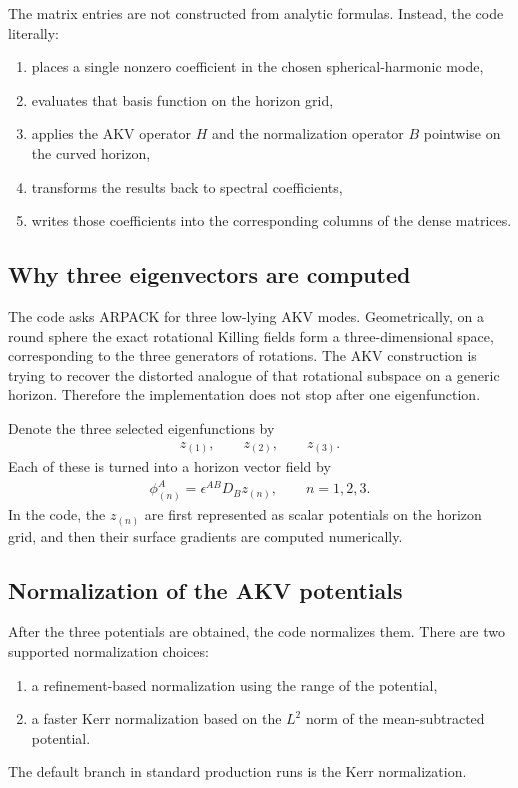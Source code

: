 The matrix entries are not constructed from analytic formulas.  Instead, the code literally:
\begin{enumerate}
\item places a single nonzero coefficient in the chosen spherical-harmonic mode,
\item evaluates that basis function on the horizon grid,
\item applies the AKV operator $H$ and the normalization operator $B$ pointwise on the curved horizon,
\item transforms the results back to spectral coefficients,
\item writes those coefficients into the corresponding columns of the dense matrices.
\end{enumerate}

\subsection{Why three eigenvectors are computed}

The code asks ARPACK for three low-lying AKV modes.  Geometrically, on a round sphere the exact rotational Killing fields form a three-dimensional space, corresponding to the three generators of rotations.  The AKV construction is trying to recover the distorted analogue of that rotational subspace on a generic horizon.  Therefore the implementation does not stop after one eigenfunction.

Denote the three selected eigenfunctions by
\begin{align}
z_{(1)}, \qquad z_{(2)}, \qquad z_{(3)}.
\end{align}
Each of these is turned into a horizon vector field by
\begin{align}
\phi^A_{(n)} = \epsilon^{AB} D_B z_{(n)},
\qquad n=1,2,3.
\label{eq:spec-phi-n}
\end{align}
In the code, the $z_{(n)}$ are first represented as scalar potentials on the horizon grid, and then their surface gradients are computed numerically.

\subsection{Normalization of the AKV potentials}

After the three potentials are obtained, the code normalizes them.  There are two supported normalization choices:
\begin{enumerate}
\item a refinement-based normalization using the range of the potential,
\item a faster Kerr normalization based on the $L^2$ norm of the mean-subtracted potential.
\end{enumerate}
The default branch in standard production runs is the Kerr normalization.

